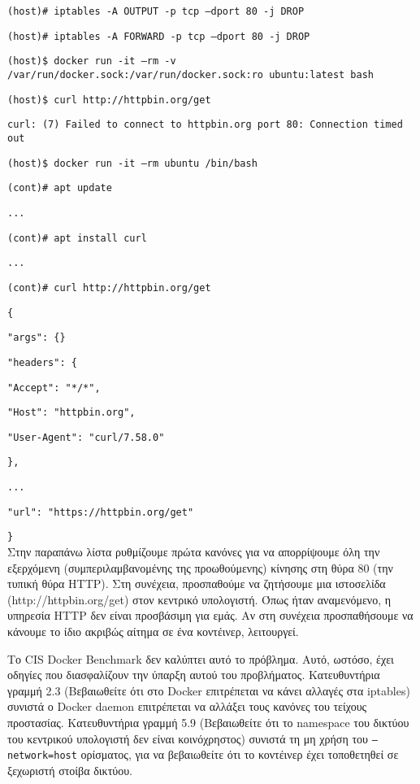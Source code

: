 \texttt{\textlatin{(host)\# iptables -A OUTPUT -p tcp --dport 80 -j DROP}}

\texttt{\textlatin{(host)\# iptables -A FORWARD -p tcp --dport 80 -j DROP}}

\texttt{\textlatin{(host)\$ docker run -it --rm -v /var/run/docker.sock:/var/run/docker.sock:ro ubuntu:latest bash}}

\texttt{\textlatin{(host)\$ curl http://httpbin.org/get}}

\texttt{\textlatin{curl: (7) Failed to connect to httpbin.org port 80: Connection timed out}}

\texttt{\textlatin{(host)\$ docker run -it --rm ubuntu /bin/bash}}

\texttt{\textlatin{(cont)\# apt update}}

\texttt{\textlatin{...}}

\texttt{\textlatin{(cont)\# apt install curl}}

\texttt{\textlatin{...}}

\texttt{\textlatin{(cont)\# curl http://httpbin.org/get}}

\texttt{\textlatin{\{}}

\texttt{\textlatin{"args": \{\}}}

\texttt{\textlatin{"headers": \{}}

\texttt{\textlatin{"Accept": "*/*",}}

\texttt{\textlatin{"Host": "httpbin.org",}}

\texttt{\textlatin{"User-Agent": "curl/7.58.0"}}

\texttt{\textlatin{\},}}

\texttt{\textlatin{...}}

\texttt{\textlatin{"url": "https://httpbin.org/get"}}

\texttt{\textlatin{\}}} \\


Στην παραπάνω λίστα ρυθμίζουμε πρώτα κανόνες για να απορρίψουμε όλη την
εξερχόμενη (συμπεριλαμβανομένης της προωθούμενης) κίνησης στη θύρα 80 (την
τυπική θύρα \textlatin{HTTP}). Στη συνέχεια, προσπαθούμε να ζητήσουμε
μια ιστοσελίδα (\textlatin{http://httpbin.org/get}) στον κεντρικό υπολογιστή.
Όπως ήταν αναμενόμενο, η υπηρεσία \textlatin{HTTP} δεν είναι προσβάσιμη για
εμάς. Αν στη συνέχεια προσπαθήσουμε να κάνουμε το ίδιο ακριβώς αίτημα
σε ένα κοντέινερ, λειτουργεί.

Το \textlatin{CIS Docker Benchmark} δεν καλύπτει αυτό το πρόβλημα. Αυτό, ωστόσο,
έχει οδηγίες που διασφαλίζουν την ύπαρξη αυτού του προβλήματος. Κατευθυντήρια
γραμμή 2.3 (Βεβαιωθείτε ότι στο Docker επιτρέπεται να κάνει αλλαγές στα
\textlatin{iptables}) συνιστά ο \textlatin{Docker daemon} επιτρέπεται να αλλάξει
τους κανόνες του τείχους προστασίας. Κατευθυντήρια γραμμή 5.9 (Βεβαιωθείτε ότι
το \textlatin{namespace} του δικτύου του κεντρικού υπολογιστή δεν είναι
κοινόχρηστος) συνιστά τη μη χρήση του \texttt{\textlatin{--network=host}}
ορίσματος, για να βεβαιωθείτε ότι το κοντέινερ έχει τοποθετηθεί σε ξεχωριστή
στοίβα δικτύου.

